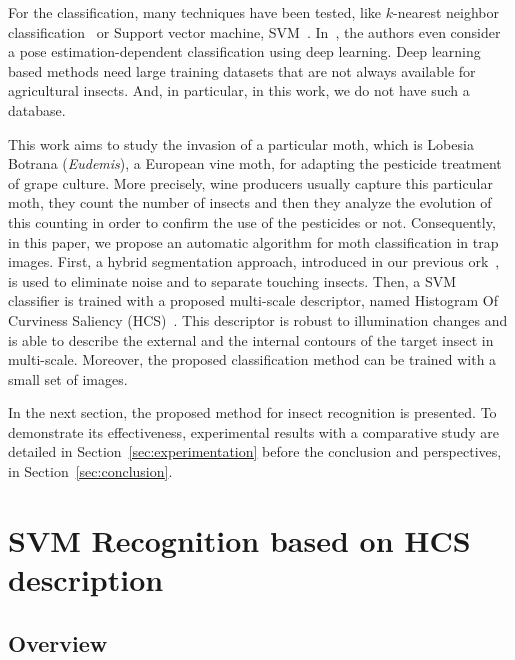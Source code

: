 \documentclass[a4paper,conference]{IEEEtran}
\begin{document}
For the classification, many techniques have been tested, like $k$-nearest neighbor classification~\cite{yalcin2015vision} or 
Support vector machine, SVM~\cite{qing2012insect}. 
In~\cite{wen2015pose}, the authors even consider a pose estimation-dependent classification using deep learning. 
Deep learning based methods need large training datasets that are not always available for agricultural insects. And, in particular, in this work, we do not have such a database. 

This work aims to study the invasion of a particular moth, which is Lobesia Botrana (\textit{Eudemis}), a European vine moth, for adapting the pesticide treatment of grape culture. More precisely, wine producers usually capture this particular moth, they count the number of insects and then they analyze the evolution of this counting in order to confirm the use of the pesticides or not. Consequently, in this paper, we propose an automatic algorithm for moth classification in trap images. First, a hybrid segmentation approach, introduced in our previous ork~\cite{bakkay2017automatic}, is used to eliminate noise and to separate touching insects. 
Then, a SVM classifier is trained with a proposed multi-scale descriptor, named Histogram Of Curviness Saliency (HCS)~\cite{7532314}. This descriptor is robust to illumination changes and is able to describe the external and the internal contours of the target insect in multi-scale. Moreover, the proposed classification method can be trained with a small set of images.

In the next section, the proposed method for insect recognition is presented. To demonstrate its effectiveness, experimental results with a comparative study are detailed in Section~\ref{sec:experimentation} before the conclusion and perspectives, in Section~\ref{sec:conclusion}. 

\section{SVM Recognition based on HCS description}
\label{sec:method}

\subsection{Overview} 
\end{document}

